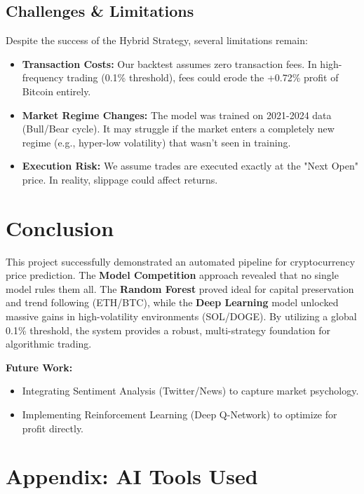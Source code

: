 \documentclass[11pt,a4paper]{article}
\begin{document}
\subsection{Challenges \& Limitations}
Despite the success of the Hybrid Strategy, several limitations remain:
\begin{itemize}
    \item \textbf{Transaction Costs:} Our backtest assumes zero transaction fees. In high-frequency trading (0.1\% threshold), fees could erode the +0.72\% profit of Bitcoin entirely.
    \item \textbf{Market Regime Changes:} The model was trained on 2021-2024 data (Bull/Bear cycle). It may struggle if the market enters a completely new regime (e.g., hyper-low volatility) that wasn't seen in training.
    \item \textbf{Execution Risk:} We assume trades are executed exactly at the "Next Open" price. In reality, slippage could affect returns.
\end{itemize}

\section{Conclusion}
\label{sec:conclusion}

This project successfully demonstrated an automated pipeline for cryptocurrency price prediction. The \textbf{Model Competition} approach revealed that no single model rules them all. The \textbf{Random Forest} proved ideal for capital preservation and trend following (ETH/BTC), while the \textbf{Deep Learning} model unlocked massive gains in high-volatility environments (SOL/DOGE). By utilizing a global 0.1\% threshold, the system provides a robust, multi-strategy foundation for algorithmic trading.

\textbf{Future Work:}
\begin{itemize}
    \item Integrating Sentiment Analysis (Twitter/News) to capture market psychology.
    \item Implementing Reinforcement Learning (Deep Q-Network) to optimize for profit directly.
\end{itemize}

\newpage
\appendix

\section{Appendix: AI Tools Used}
\label{app:ai_tools}
\end{document}
